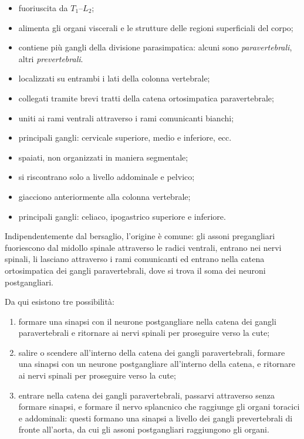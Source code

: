 \begin{itemize}
  \item fuoriuscita da $T_1$--$L_2$;
  \item alimenta gli organi viscerali e le strutture delle regioni
    superficiali del corpo;
  \item contiene più gangli della divisione parasimpatica: alcuni sono
    \textit{paravertebrali}, altri \textit{prevertebrali}.
\end{itemize}

\begin{itemize}
  \item localizzati su entrambi i lati della colonna vertebrale;
  \item collegati tramite brevi tratti della catena ortosimpatica
    paravertebrale;
  \item uniti ai rami ventrali attraverso i rami comunicanti bianchi;
  \item principali gangli: cervicale superiore, medio e inferiore, ecc.
\end{itemize}

\begin{itemize}
  \item spaiati, non organizzati in maniera segmentale;
  \item si riscontrano solo a livello addominale e pelvico;
  \item giacciono anteriormente alla colonna vertebrale;
  \item principali gangli: celiaco, ipogastrico superiore e inferiore.
\end{itemize}

Indipendentemente dal bersaglio, l'origine è comune: gli assoni
pregangliari fuoriescono dal midollo spinale attraverso le radici
ventrali, entrano nei nervi spinali, li lasciano attraverso i rami
comunicanti ed entrano nella catena ortosimpatica dei gangli paravertebrali,
dove si trova il soma dei neuroni postgangliari.

Da qui esistono tre possibilità:
\begin{enumerate}
  \item formare una sinapsi con il neurone postgangliare nella catena dei
    gangli paravertebrali e ritornare ai nervi spinali per proseguire
    verso la cute;
  \item salire o scendere all'interno della catena dei gangli
    paravertebrali, formare una sinapsi con un neurone postgangliare
    all'interno della catena, e ritornare ai nervi spinali per proseguire
    verso la cute;
  \item entrare nella catena dei gangli paravertebrali, passarvi
    attraverso senza formare sinapsi, e formare il nervo splancnico che
    raggiunge gli organi toracici e addominali: questi formano una
    sinapsi a livello dei gangli prevertebrali di fronte all'aorta, da cui
    gli assoni postgangliari raggiungono gli organi.
\end{enumerate}

